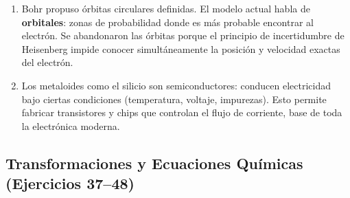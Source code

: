 \documentclass[12pt, a4paper]{article}
\begin{document}
\begin{enumerate}[leftmargin=*, label=\textbf{\arabic*.}]
  \item Bohr propuso órbitas circulares definidas. El modelo actual habla de \textbf{orbitales}: zonas de probabilidad donde es más probable encontrar al electrón. Se abandonaron las órbitas porque el principio de incertidumbre de Heisenberg impide conocer simultáneamente la posición y velocidad exactas del electrón.

  \item Los metaloides como el silicio son semiconductores: conducen electricidad bajo ciertas condiciones (temperatura, voltaje, impurezas). Esto permite fabricar transistores y chips que controlan el flujo de corriente, base de toda la electrónica moderna.
\end{enumerate}

\subsection*{Transformaciones y Ecuaciones Químicas (Ejercicios 37--48)}
\end{document}
